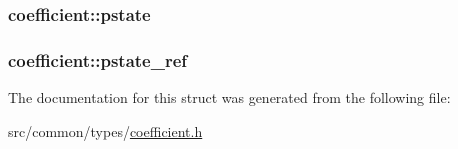 \subsubsection[{\texorpdfstring{pstate}{pstate}}]{ coefficient\+::pstate}\hypertarget{structcoefficient_a8925983fbabe494fd60712bf1b3450a7}{}\label{structcoefficient_a8925983fbabe494fd60712bf1b3450a7}
\subsubsection[{\texorpdfstring{pstate\+\_\+ref}{pstate_ref}}]{ coefficient\+::pstate\+\_\+ref}\hypertarget{structcoefficient_af9f59f76144099c646a2a0b7e621a0ad}{}\label{structcoefficient_af9f59f76144099c646a2a0b7e621a0ad}


The documentation for this struct was generated from the following file\+:\begin{DoxyCompactItemize}
\item 
src/common/types/\hyperlink{coefficient_8h}{coefficient.\+h}\end{DoxyCompactItemize}
